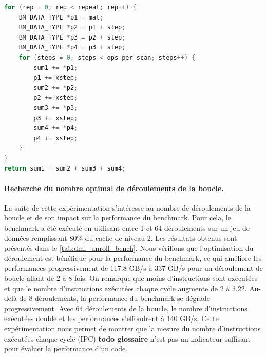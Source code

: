     \begin{lstlisting}[label=lst:dml_unroll_spe ,language=C, caption=Deuxième version du déroulement par 4 utilisant 4 variables sum.]
for (rep = 0; rep < repeat; rep++) {
    BM_DATA_TYPE *p1 = mat;
    BM_DATA_TYPE *p2 = p1 + step;
    BM_DATA_TYPE *p3 = p2 + step;
    BM_DATA_TYPE *p4 = p3 + step;
    for (steps = 0; steps < ops_per_scan; steps++) {
        sum1 += *p1;
        p1 += xstep;
        sum2 += *p2;
        p2 += xstep;
        sum3 += *p3;
        p3 += xstep;
        sum4 += *p4;
        p4 += xstep;
    }
}
return sum1 + sum2 + sum3 + sum4;
\end{lstlisting}
    
    \paragraph{Recherche du nombre optimal de déroulements de la boucle.}
    
        La suite de cette expérimentation s'intéresse au nombre de déroulements de la boucle et de son impact sur la performance du benchmark. Pour cela, le benchmark a été exécuté en utilisant entre 1 et 64 déroulements sur un jeu de données remplissant 80\% du cache de niveau 2. Les résultats obtenus sont présentés dans le \autoref{tab:dml_unroll_bench}. Nous vérifions que l'optimisation du déroulement est bénéfique pour la performance du benchmark, ce qui améliore les performances progressivement de 117.8 GB/s à 337 GB/s pour un déroulement de boucle allant de 2 à 8 fois. On remarque que moins d'instructions sont exécutées et que le nombre d'instructions exécutées chaque cycle augmente de 2 à 3.22. Au-delà de 8 déroulements, la performance du benchmark se dégrade progressivement. Avec 64 déroulements de la boucle, le nombre d'instructions exécutées double et les performances s'effondrent à 140 GB/s. Cette expérimentation nous permet de montrer que la mesure du nombre d'instructions exécutées chaque cycle (IPC) \textbf{todo glossaire} n'est pas un indicateur suffisant pour évaluer la performance d'un code. 
    
